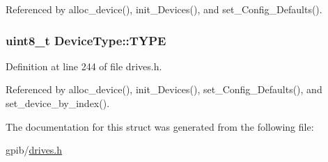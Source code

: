 Referenced by alloc\+\_\+device(), init\+\_\+\+Devices(), and set\+\_\+\+Config\+\_\+\+Defaults().

\subsubsection[{\texorpdfstring{T\+Y\+PE}{TYPE}}]{\setlength{\rightskip}{0pt plus 5cm}uint8\+\_\+t Device\+Type\+::\+T\+Y\+PE}\hypertarget{structDeviceType_acee5219162b6f47a9423b2086d127ede}{}\label{structDeviceType_acee5219162b6f47a9423b2086d127ede}


Definition at line 244 of file drives.\+h.



Referenced by alloc\+\_\+device(), init\+\_\+\+Devices(), set\+\_\+\+Config\+\_\+\+Defaults(), and set\+\_\+device\+\_\+by\+\_\+index().



The documentation for this struct was generated from the following file\+:\begin{DoxyCompactItemize}
\item 
gpib/\hyperlink{drives_8h}{drives.\+h}\end{DoxyCompactItemize}
